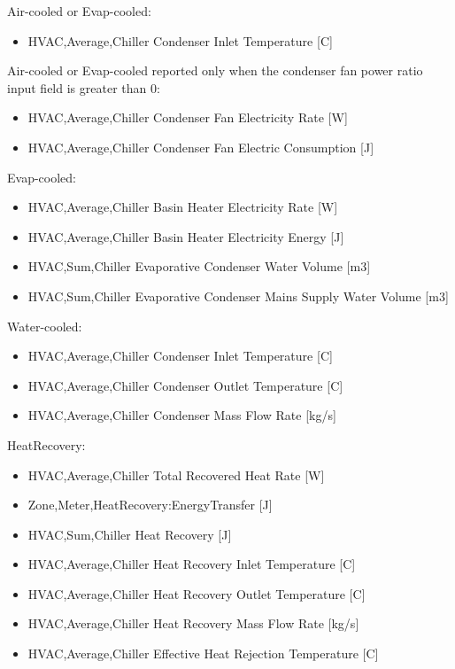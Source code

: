 Air-cooled or Evap-cooled:

\begin{itemize}
    \tightlist
    \item
    HVAC,Average,Chiller Condenser Inlet Temperature {[}C{]}
\end{itemize}

Air-cooled or Evap-cooled reported only when the condenser fan power ratio input field is greater than 0:

\begin{itemize}
    \item
    HVAC,Average,Chiller Condenser Fan Electricity Rate {[}W{]}
    \item
    HVAC,Average,Chiller Condenser Fan Electric Consumption {[}J{]}
\end{itemize}

Evap-cooled:

\begin{itemize}
    \item
    HVAC,Average,Chiller Basin Heater Electricity Rate {[}W{]}
    \item
    HVAC,Average,Chiller Basin Heater Electricity Energy {[}J{]}
    \item
    HVAC,Sum,Chiller Evaporative Condenser Water Volume {[}m3{]}
    \item
    HVAC,Sum,Chiller Evaporative Condenser Mains Supply Water Volume {[}m3{]}
\end{itemize}

Water-cooled:

\begin{itemize}
    \item
    HVAC,Average,Chiller Condenser Inlet Temperature {[}C{]}
    \item
    HVAC,Average,Chiller Condenser Outlet Temperature {[}C{]}
    \item
    HVAC,Average,Chiller Condenser Mass Flow Rate {[}kg/s{]}
\end{itemize}

HeatRecovery:

\begin{itemize}
    \item
    HVAC,Average,Chiller Total Recovered Heat Rate {[}W{]}
    \item
    Zone,Meter,HeatRecovery:EnergyTransfer {[}J{]}
    \item
    HVAC,Sum,Chiller Heat Recovery {[}J{]}
    \item
    HVAC,Average,Chiller Heat Recovery Inlet Temperature {[}C{]}
    \item
    HVAC,Average,Chiller Heat Recovery Outlet Temperature {[}C{]}
    \item
    HVAC,Average,Chiller Heat Recovery Mass Flow Rate {[}kg/s{]}
    \item
    HVAC,Average,Chiller Effective Heat Rejection Temperature {[}C{]}
\end{itemize}

